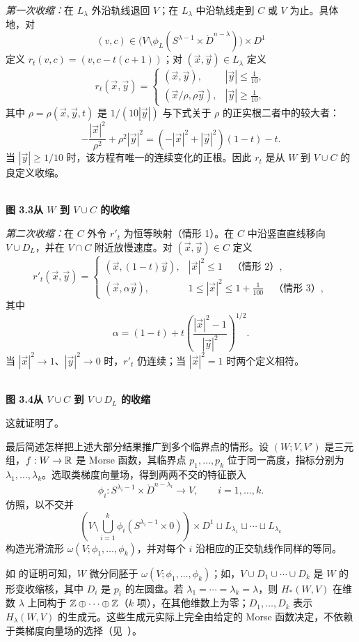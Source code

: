 \textit{第一次收缩：}在 $L_\lambda$ 外沿轨线退回 $V$；在 $L_\lambda$ 中沿轨线走到 $C$ 或 $V$ 为止。具体地，对
\[
 (v,c)\in\bigl(V\setminus\phi_L(S^{\lambda-1}\times\mathring D^{n-\lambda})\bigr)\times D^1
\]
定义 $r_t(v,c)=(v,c-t(c+1))$；对 $(\vec x,\vec y)\in L_\lambda$ 定义
\[
r_t(\vec x,\vec y)=
\begin{cases}
(\vec x,\vec y),&|\vec y|\leq\tfrac1{10},\\
(\vec x/\rho,\rho\vec y),&|\vec y|\geq\tfrac1{10},
\end{cases}
\]
其中 $\rho=\rho(\vec x,\vec y,t)$ 是 $1/(10|\vec y|)$ 与下式关于 $\rho$ 的正实根二者中的较大者：
\[
 -\frac{|\vec x|^2}{\rho^2}+\rho^2|\vec y|^2
 =(-|\vec x|^2+|\vec y|^2)(1-t)-t.
\]
当 $|\vec y|\geq1/10$ 时，该方程有唯一的连续变化的正根。因此 $r_t$ 是从 $W$ 到 $V\cup C$ 的良定义收缩。

\begin{center}
 \FigThreeThree\\[-.4em]
 \label{fig:3.3}\textbf{图 3.3\quad 从 $W$ 到 $V\cup C$ 的收缩}
\end{center}

\textit{第二次收缩：}在 $C$ 外令 $r'_t$ 为恒等映射（情形 1）。在 $C$ 中沿竖直直线移向 $V\cup D_L$，并在 $V\cap C$ 附近放慢速度。对 $(\vec x,\vec y)\in C$ 定义
\[
r'_t(\vec x,\vec y)=
\begin{cases}
(\vec x,(1-t)\vec y),&|\vec x|^2\leq1\quad\text{（情形 2）},\\
(\vec x,\alpha\vec y),&1\leq|\vec x|^2\leq1+\tfrac1{100}\quad\text{（情形 3）},
\end{cases}
\]
其中
\[
 \alpha=(1-t)+t\left(\frac{|\vec x|^2-1}{|\vec y|^2}\right)^{1/2}.
\]
当 $|\vec x|^2\to1$、$|\vec y|^2\to0$ 时，$r'_t$ 仍连续；当 $|\vec x|^2=1$ 时两个定义相符。

\begin{center}
 \FigThreeFour\\[-.4em]
 \label{fig:3.4}\textbf{图 3.4\quad 从 $V\cup C$ 到 $V\cup D_L$ 的收缩}
\end{center}
这就证明了。
\EndProof

\Remark 最后简述怎样把上述大部分结果推广到多个临界点的情形。设 $(W;V,V')$ 是三元组，$f:W\to\mathbb{R}$ 是 Morse 函数，其临界点 $p_1,\ldots,p_k$ 位于同一高度，指标分别为 $\lambda_1,\ldots,\lambda_k$。选取类梯度向量场，得到两两不交的特征嵌入
\[
 \phi_i:S^{\lambda_i-1}\times\mathring D^{n-\lambda_i}\longrightarrow V,
 \qquad i=1,\ldots,k.
\]
仿照，以不交并
\[
 \left(V\setminus\bigcup_{i=1}^k\phi_i(S^{\lambda_i-1}\times0)\right)\times D^1
 \sqcup L_{\lambda_1}\sqcup\cdots\sqcup L_{\lambda_k}
\]
构造光滑流形 $\omega(V;\phi_1,\ldots,\phi_k)$，并对每个 $i$ 沿相应的正交轨线作同样的等同。

如 的证明可知，$W$ 微分同胚于 $\omega(V;\phi_1,\ldots,\phi_k)$；如，$V\cup D_1\cup\cdots\cup D_k$ 是 $W$ 的形变收缩核，其中 $D_i$ 是 $p_i$ 的左圆盘。若 $\lambda_1=\cdots=\lambda_k=\lambda$，则 $H_*(W,V)$ 在维数 $\lambda$ 上同构于 $\mathbb{Z}\oplus\cdots\oplus\mathbb{Z}$（$k$ 项），在其他维数上为零；$D_1,\ldots,D_k$ 表示 $H_\lambda(W,V)$ 的生成元。这些生成元实际上完全由给定的 Morse 函数决定，不依赖于类梯度向量场的选择（见~\cite[p.~20]{ref04}）。

